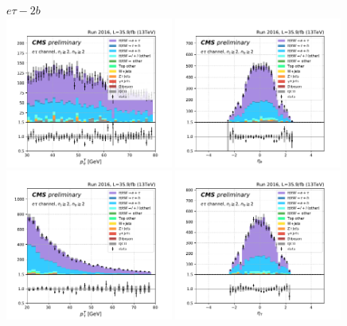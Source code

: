 \begin{figure}[ht]
    \centering
    $e\tau - 2b$ \\
    \includegraphics[width=0.49\textwidth]{chapters/Appendix/sectionPlots/figures/kinematics_pickles/etau/2b/etau_2b_lepton1_pt.pdf}
    \includegraphics[width=0.49\textwidth]{chapters/Appendix/sectionPlots/figures/kinematics_pickles/etau/2b/etau_2b_lepton1_eta.pdf}
    \includegraphics[width=0.49\textwidth]{chapters/Appendix/sectionPlots/figures/kinematics_pickles/etau/2b/etau_2b_lepton2_pt.pdf}
    \includegraphics[width=0.49\textwidth]{chapters/Appendix/sectionPlots/figures/kinematics_pickles/etau/2b/etau_2b_lepton2_eta.pdf}

\end{figure}
